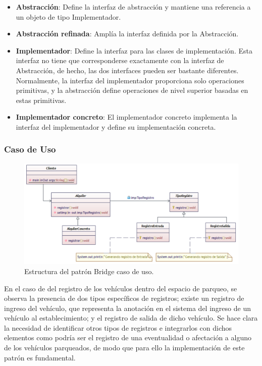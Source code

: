 \begin{itemize}
	\item \textbf{Abstracción}: Define la interfaz de abstracción y mantiene una referencia a un objeto de tipo Implementador.
	\item \textbf{Abstracción refinada}: Amplía la interfaz definida por la Abstracción.
	\item \textbf{Implementador}: Define la interfaz para las clases de implementación. Esta interfaz no tiene que corresponderse exactamente con la interfaz de Abstracción, de hecho, las dos interfaces pueden ser bastante diferentes. Normalmente, la interfaz del implementador proporciona solo operaciones primitivas, y la abstracción define operaciones de nivel superior basadas en estas primitivas.
	\item \textbf{Implementador concreto}: El implementador concreto implementa la interfaz del implementador y define su implementación concreta.
\end{itemize}


\subsubsection{Caso de Uso}

\begin{figure}[th!]
	\centering
	\includegraphics[width=.7\linewidth]{imagenes/Patrones/Bridge_caso.pdf}
	\caption{Estructura del patrón Bridge caso de uso.\cite{gof}}	
\end{figure}

En el caso de del registro de los vehículos dentro del espacio de parqueo, se observa la presencia de dos tipos específicos de registros; existe un registro de ingreso del vehículo, que representa la anotación en el sistema del ingreso de un vehículo al establecimiento; y el registro de salida de dicho vehículo.
Se hace clara la necesidad de identificar otros tipos de registros e integrarlos con dichos elementos como podría ser el registro de una eventualidad o afectación a alguno de los vehículos parqueados, de modo que para ello la implementación de este patrón es fundamental.

